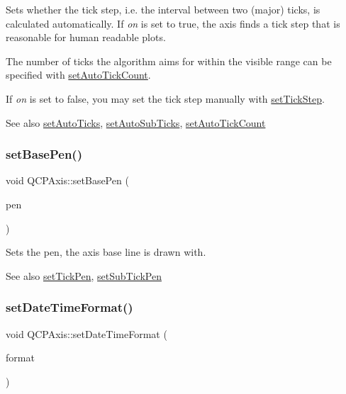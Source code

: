 Sets whether the tick step, i.\+e. the interval between two (major) ticks, is calculated automatically. If {\itshape on} is set to true, the axis finds a tick step that is reasonable for human readable plots.

The number of ticks the algorithm aims for within the visible range can be specified with \mbox{\hyperlink{class_q_c_p_axis_a7c7111cbeac9ec5fcb40f93a1ef51a0b}{set\+Auto\+Tick\+Count}}.

If {\itshape on} is set to false, you may set the tick step manually with \mbox{\hyperlink{class_q_c_p_axis_af727db0acc6492c4c774c0700e738205}{set\+Tick\+Step}}.

\begin{DoxySeeAlso}{See also}
\mbox{\hyperlink{class_q_c_p_axis_ae867c23d3a6a7bd4d09cc66c5d018f63}{set\+Auto\+Ticks}}, \mbox{\hyperlink{class_q_c_p_axis_adcbdec7a60054b88571e89599f4a45bf}{set\+Auto\+Sub\+Ticks}}, \mbox{\hyperlink{class_q_c_p_axis_a7c7111cbeac9ec5fcb40f93a1ef51a0b}{set\+Auto\+Tick\+Count}} 
\end{DoxySeeAlso}
\mbox{\label{class_q_c_p_axis_a778d45fb71b3c7ab3bb7079e18b058e4}} 
\subsubsection{\texorpdfstring{set\+Base\+Pen()}{setBasePen()}}
{\footnotesize\ttfamily void Q\+C\+P\+Axis\+::set\+Base\+Pen (\begin{DoxyParamCaption}\item[{const Q\+Pen \&}]{pen }\end{DoxyParamCaption})}

Sets the pen, the axis base line is drawn with.

\begin{DoxySeeAlso}{See also}
\mbox{\hyperlink{class_q_c_p_axis_ad80923bcc1c5da4c4db602c5325e797e}{set\+Tick\+Pen}}, \mbox{\hyperlink{class_q_c_p_axis_aede4028ae7516bd51a60618a8233f9cf}{set\+Sub\+Tick\+Pen}} 
\end{DoxySeeAlso}
\mbox{\label{class_q_c_p_axis_a2ee0191daa03524a682113e63e05f7a7}} 
\subsubsection{\texorpdfstring{set\+Date\+Time\+Format()}{setDateTimeFormat()}}
{\footnotesize\ttfamily void Q\+C\+P\+Axis\+::set\+Date\+Time\+Format (\begin{DoxyParamCaption}\item[{const Q\+String \&}]{format }\end{DoxyParamCaption})}

